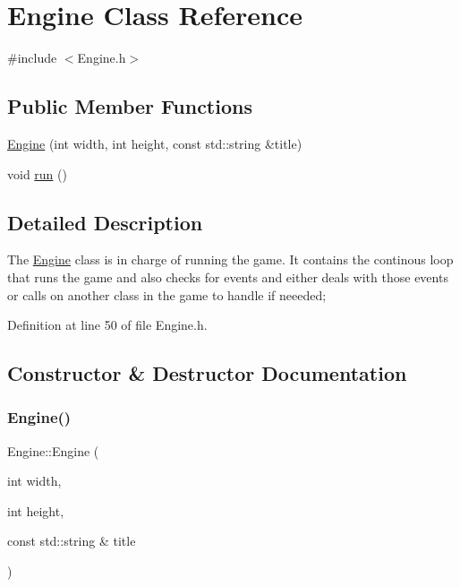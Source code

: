 \hypertarget{class_engine}{}\section{Engine Class Reference}
\label{class_engine}


{\ttfamily \#include $<$Engine.\+h$>$}

\subsection*{Public Member Functions}
\begin{DoxyCompactItemize}
\item 
\mbox{\hyperlink{class_engine_a47e331ce6aa8fe844516373a695a4f8d}{Engine}} (int width, int height, const std\+::string \&title)
\item 
void \mbox{\hyperlink{class_engine_a1a210cf30d6bd330b3649439ecd6d6cc}{run}} ()
\end{DoxyCompactItemize}


\subsection{Detailed Description}
The \mbox{\hyperlink{class_engine}{Engine}} class is in charge of running the game. It contains the continous loop that runs the game and also checks for events and either deals with those events or calls on another class in the game to handle if neeeded; 

Definition at line 50 of file Engine.\+h.



\subsection{Constructor \& Destructor Documentation}
\mbox{\label{class_engine_a47e331ce6aa8fe844516373a695a4f8d}} 
\subsubsection{\texorpdfstring{Engine()}{Engine()}}
{\footnotesize\ttfamily Engine\+::\+Engine (\begin{DoxyParamCaption}\item[{int}]{width,  }\item[{int}]{height,  }\item[{const std\+::string \&}]{title }\end{DoxyParamCaption})}

